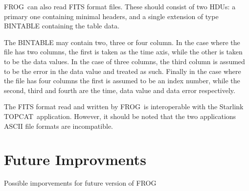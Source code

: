 \documentclass[twoside,11pt]{article}
\newcommand{\xlabel}[1]{}
\renewcommand{\_}{\texttt{\symbol{95}}}
\newcommand{\FROG}{\textsf{FROG}}
\newcommand{\TOPCAT}{\textsf{TOPCAT}}
\begin{document}
\FROG\ can also read FITS format files. These should consist of two HDUs: a primary one containing minimal headers, and a single extension of type BINTABLE containing the table data.

The BINTABLE may contain two, three or four column. In the case where the file has two columns, the first is taken as the time axis, while the other is taken to be the data values. In the case of three columns, the third column is assumed to be the error in the data value and treated as such. Finally in the case where the file has four columns the first is assumed to be an index number, while the second, third and fourth are the time, data value and data error respectively.

The FITS format read and written by \FROG\ is interoperable with the Starlink \TOPCAT\ application. However, it should be noted that the two applications ASCII file formats are incompatible.

\section{Future Improvments\xlabel{future}}

Possible imporvements for future version of \FROG\
\end{document}
